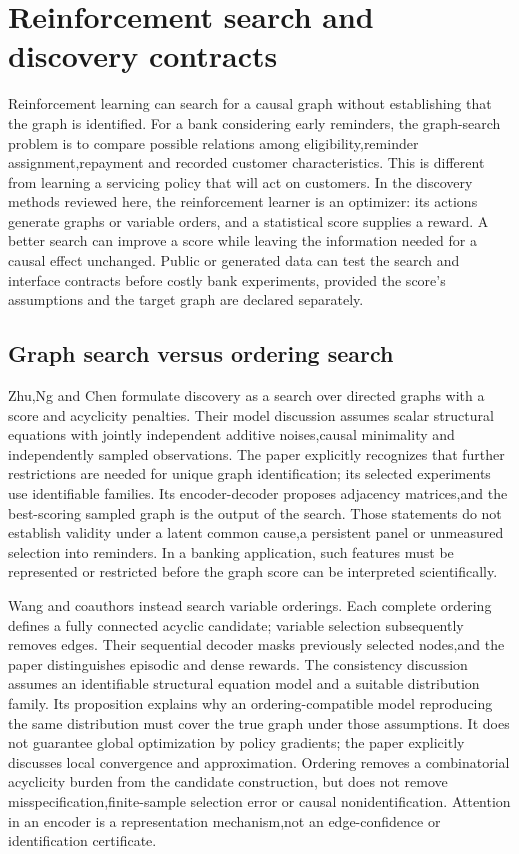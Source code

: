 \section[Reinforcement search and discovery contracts]{Reinforcement search and discovery contracts}
\label{sec:exec28-rl}
Reinforcement learning can search for a causal graph without establishing that the graph is identified.
For a bank considering early reminders, the graph-search problem is to compare possible relations
among eligibility,reminder assignment,repayment and recorded customer characteristics. This is
different from learning a servicing policy that will act on customers. In the discovery methods
reviewed here, the reinforcement learner is an optimizer: its actions generate graphs or variable
orders, and a statistical score supplies a reward. A better search can improve a score while
leaving the information needed for a causal effect unchanged. Public or generated data can test
the search and interface contracts before costly bank experiments, provided the score's assumptions
and the target graph are declared separately.\citep{exec28_rl_zhu,exec28_rl_wang}

\subsection{Graph search versus ordering search}
Zhu,Ng and Chen formulate discovery as a search over directed graphs with a score and acyclicity
penalties. Their model discussion assumes scalar structural equations with jointly independent
additive noises,causal minimality and independently sampled observations. The paper explicitly
recognizes that further restrictions are needed for unique graph identification; its selected
experiments use identifiable families. Its encoder-decoder proposes adjacency matrices,and the
best-scoring sampled graph is the output of the search. Those statements do not establish validity
under a latent common cause,a persistent panel or unmeasured selection into reminders. In a
banking application, such features must be represented or restricted before the graph score can
be interpreted scientifically.\citep{exec28_rl_zhu}

Wang and coauthors instead search variable orderings. Each complete ordering defines a fully
connected acyclic candidate; variable selection subsequently removes edges. Their sequential
decoder masks previously selected nodes,and the paper distinguishes episodic and dense rewards.
The consistency discussion assumes an identifiable structural equation model and a suitable
distribution family. Its proposition explains why an ordering-compatible model reproducing the
same distribution must cover the true graph under those assumptions. It does not guarantee
global optimization by policy gradients; the paper explicitly discusses local convergence and
approximation. Ordering removes a combinatorial acyclicity burden from the candidate construction,
but does not remove misspecification,finite-sample selection error or causal nonidentification.
Attention in an encoder is a representation mechanism,not an edge-confidence or identification
certificate.\citep{exec28_rl_wang}

